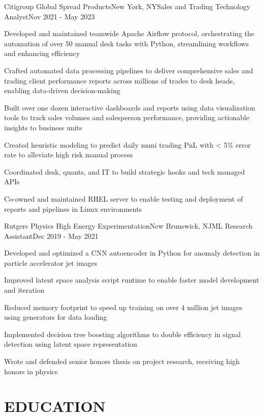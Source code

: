 \documentclass[pdfauthor={Michael Tran},pdftitle={Michael Tran}]{resume}
\begin{document}
\begin{experience}{Citigroup Global Spread Products}{New York, NY}{Sales and Trading Technology Analyst}{Nov 2021 - May 2023}
    \item Developed and maintained teamwide Apache Airflow protocol, orchestrating the automation of over 50 manual desk tasks with Python, streamlining workflows and enhancing efficiency
    \item Crafted automated data processing pipelines to deliver comprehensive sales and trading client performance reports across millions of trades to desk heads, enabling data-driven decision-making
    \item Built over one dozen interactive dashboards and reports using data visualization tools to track sales volumes and salesperson performance, providing actionable insights to business units
    \item Created heuristic modeling to predict daily muni trading PnL with < 5\% error rate to alleviate high risk manual process
    \item Coordinated desk, quants, and IT to build strategic hooks and tech managed APIs
    \item Co-owned and maintained RHEL server to enable testing and deployment of reports and pipelines in Linux environments
\end{experience}

\begin{experience}{Rutgers Physics High Energy Experimentation}{New Brunswick, NJ}{ML Research Assistant}{Dec 2019 - May 2021}
    \item Developed and optimized a CNN autoencoder in Python for anomaly detection in particle accelerator jet images
    \item Improved latent space analysis script runtime to enable faster model development and iteration
    \item Reduced memory footprint to speed up training on over 4 million jet images using generators for data loading
    \item Implemented decision tree boosting algorithms to double efficiency in signal detection using latent space representation
    \item Wrote and defended senior honors thesis on project research, receiving high honors in physics
\end{experience}

\separator

\section{EDUCATION}
\end{document}
